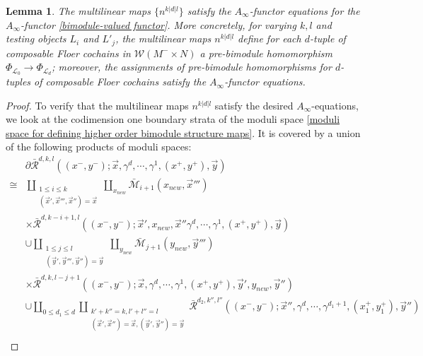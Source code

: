 \documentclass{amsart}
\newtheorem{lemma}[theorem]{Lemma}
\numberwithin{equation}{section}
\numberwithin{figure}{section}
\begin{document}
\begin{lemma}
	The multilinear maps $\{n^{k|d|l}\}$ satisfy the $A_{\infty}$-functor equations for the $A_{\infty}$-functor \eqref{bimodule-valued functor}. More concretely, for varying $k, l$ and testing objects $L_{i}$ and $L'_{j}$, the multilinear maps $n^{k|d|l}$ define for each $d$-tuple of composable Floer cochains in $\mathcal{W}(M^{-} \times N)$ a pre-bimodule homomorphism
$\Phi_{\mathcal{L}_{0}} \to \Phi_{\mathcal{L}_{d}}$;
moreover, the assignments of pre-bimodule homomorphisms for $d$-tuples of composable Floer cochains satisfy the $A_{\infty}$-functor equations.
\end{lemma}
\begin{proof}
	To verify that the multilinear maps $n^{k|d|l}$ satisfy the desired $A_{\infty}$-equations, we look at the codimension one boundary strata of the moduli space \eqref{moduli space for defining higher order bimodule structure maps}. It is covered by a union of the following products of moduli spaces:
\begin{equation} \label{boundary stratum of the moduli space defining higher order bimodule homomorphism}
\begin{split}
&\partial \bar{\mathcal{R}}^{d, k, l}((x^{-}, y^{-}); \vec{x}, \gamma^{d}, \cdots, \gamma^{1}, (x^{+}, y^{+}), \vec{y})\\
\cong &\coprod_{\substack{1 \le i \le k\\ (\vec{x}', \vec{x}''', \vec{x}'') = \vec{x}}} \coprod_{x_{new}}
\bar{\mathcal{M}}_{i+1}(x_{new}, \vec{x}''')\\
&\times \bar{\mathcal{R}}^{d, k-i+1, l}((x^{-}, y^{-}); \vec{x}', x_{new}, \vec{x}'' \gamma^{d}, \cdots, \gamma^{1}, (x^{+}, y^{+}), \vec{y})\\
&\cup \coprod_{\substack{1 \le j \le l\\ (\vec{y}', \vec{y}''', \vec{y}'') = \vec{y}}} \coprod_{y_{new}}
\bar{\mathcal{M}}_{j+1}(y_{new}, \vec{y}''')\\
& \times \bar{\mathcal{R}}^{d, k, l-j+1}((x^{-}, y^{-}); \vec{x}, \gamma^{d}, \cdots, \gamma^{1}, (x^{+}, y^{+}), \vec{y}', y_{new}, \vec{y}'')\\
&\cup \coprod_{0 \le d_{1} \le d} \coprod_{\substack{k'+k''=k, l'+l''=l\\ (\vec{x}', \vec{x}'') = \vec{x}, (\vec{y}', \vec{y}'') = \vec{y}}} 
\bar{\mathcal{R}}^{d_{2}, k'', l''}((x^{-}, y^{-}); \vec{x}'', \gamma^{d}, \cdots, \gamma^{d_{1}+1}, (x^{+}_{1}, y^{+}_{1}), \vec{y}'')\\

\end{split}
\end{equation}
\end{proof}
\end{document}
